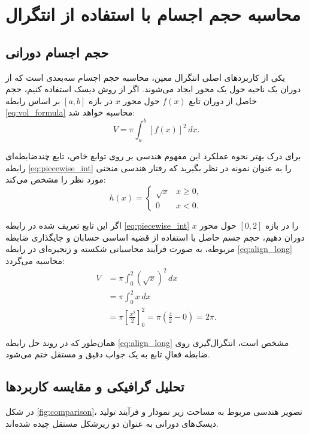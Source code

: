 \hypertarget{target:chap4}{}\chapter{محاسبه حجم اجسام با استفاده از انتگرال}\label{chap:volume}

\section{حجم اجسام دورانی}
یکی از کاربردهای اصلی انتگرال معین، محاسبه حجم اجسام سه‌بعدی است که از دوران یک ناحیه حول یک محور ایجاد می‌شوند. اگر از روش دیسک استفاده کنیم، حجم حاصل از دوران تابع $f(x)$ حول محور $x$ در بازه $[a,b]$ بر اساس رابطه \eqref{eq:vol_formula} محاسبه خواهد شد:
\begin{equation}
	V = \pi \int_{a}^{b} [f(x)]^2 \, dx.
	\label{eq:vol_formula}
\end{equation}

برای درک بهتر نحوه عملکرد این مفهوم هندسی بر روی توابع خاص، تابع چندضابطه‌ای رابطه \eqref{eq:piecewise_int} را به عنوان نمونه در نظر بگیرید که رفتار هندسی منحنی مورد نظر را مشخص می‌کند:
\begin{equation}
	h(x) = 
	\begin{cases}
		\sqrt{x} & x \ge 0, \\
		0 & x < 0.
	\end{cases}
	\label{eq:piecewise_int}
\end{equation}

اگر این تابع تعریف شده در رابطه \eqref{eq:piecewise_int} را در بازه $[0,2]$ حول محور $x$ دوران دهیم، حجم جسم حاصل با استفاده از قضیه اساسی حسابان و جایگذاری ضابطه مربوطه، به صورت فرآیند محاسباتی شکسته و زنجیره‌ای در رابطه \eqref{eq:align_long} محاسبه می‌گردد:
\begin{align}
	V &= \pi \int_{0}^{2} (\sqrt{x})^2 \, dx \nonumber \\
	&= \pi \int_{0}^{2} x \, dx \nonumber \\
	&= \pi \left[ \frac{x^2}{2} \right]_{0}^{2} = \pi \left( \frac{4}{2} - 0 \right) = 2\pi.
	\label{eq:align_long}
\end{align}

همان‌طور که در روند حل رابطه \eqref{eq:align_long} مشخص است، انتگرال‌گیری روی ضابطه فعالِ تابع به یک جواب دقیق و مستقل ختم می‌شود.

\section{تحلیل گرافیکی و مقایسه کاربردها}
در شکل \ref{fig:comparison}، تصویر هندسی مربوط به مساحت زیر نمودار و فرآیند تولید دیسک‌های دورانی به عنوان دو زیرشکل مستقل چیده شده‌اند.

